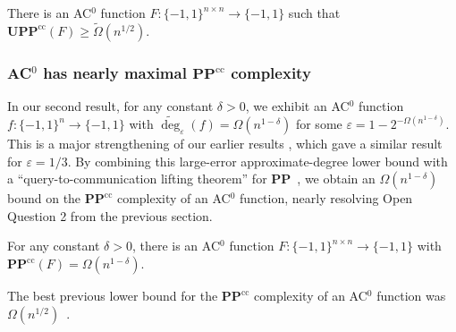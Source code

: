 \documentclass{toc}
\newcommand{\bits}{\{-1,1\}}
\newcommand{\PP}{\mathbf{PP}}
\newcommand{\UPP}{\mathbf{UPP}}
\newcommand{\eps}{\varepsilon}
\newcommand{\adeg}{\widetilde{\operatorname{deg}}}
\begin{document}
\begin{corollary} \label{cor:signrank}
	There is an AC$^0$
	function $F \colon \bits^{n \times n} \to \bits$ 
	such that $\UPP^{\text{cc}}(F) \geq \tilde{\Omega}(n^{1/2})$.
\end{corollary} 


\subsubsection{\texorpdfstring{AC$^0$ has nearly maximal $\PP^{\text{cc}}$
    complexity}{AC0 has nearly maximal PPcc complexity}}
\label{s:discintro}
In our second result, for any constant $\delta > 0$, we exhibit an AC$^0$ function $f \colon \bits^n \to \bits$ with $\adeg_{\eps}(f) = \Omega(n^{1-\delta})$
for some $\eps= 1-2^{-\Omega(n^{1-\delta})}$. This is a major strengthening
of our %
earlier results \cite{adegsurj, bkt},
which
%
gave  %
a similar result for $\eps=1/3$.
By combining this large-error approximate-degree %
lower bound
with a ``query-to-communication lifting theorem'' for $\PP$~\cite{patmat}, we obtain an $\Omega(n^{1-\delta})$ bound on the $\PP^{\text{cc}}$ complexity
of an AC$^0$ function, nearly resolving Open Question 2 from the previous section. 

\begin{theorem} \label{discthm} \label{thm:discintro}
	For any constant $\delta > 0$, there is an AC$^0$ function $F \colon \bits^{n \times n} \to \bits$ with $\PP^{\text{cc}}(F) = \Omega(n^{1-\delta})$.
\end{theorem}

\label{s:disc}


The best previous lower bound for the $\PP^{\text{cc}}$ complexity of an AC$^0$ function was  $\Omega(n^{1/2})$~\cite{sherstov15}.

%
%
\end{document}
